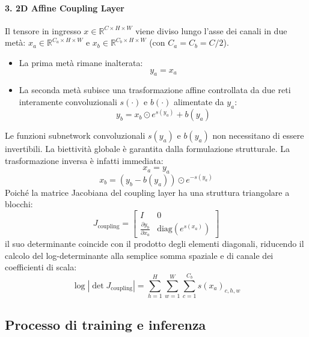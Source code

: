 \paragraph{3. 2D Affine Coupling Layer}
Il tensore in ingresso $x \in \mathbb{R}^{C \times H \times W}$ viene diviso lungo l'asse dei canali in due metà: $x_a \in \mathbb{R}^{C_a \times H \times W}$ e $x_b \in \mathbb{R}^{C_b \times H \times W}$ (con $C_a = C_b = C/2$).
\begin{itemize}
    \item La prima metà rimane inalterata:
    \begin{equation}
        y_a = x_a
    \end{equation}
    \item La seconda metà subisce una trasformazione affine controllata da due reti interamente convoluzionali $s(\cdot)$ e $b(\cdot)$ alimentate da $y_a$:
    \begin{equation}
        y_b = x_b \odot e^{s(y_a)} + b(y_a)
    \end{equation}
\end{itemize}
Le funzioni subnetwork convoluzionali $s(y_a)$ e $b(y_a)$ non necessitano di essere invertibili. La biettività globale è garantita dalla formulazione strutturale. La trasformazione inversa è infatti immediata:
\begin{equation}
    x_a = y_a
\end{equation}
\begin{equation}
    x_b = (y_b - b(y_a)) \odot e^{-s(y_a)}
\end{equation}
Poiché la matrice Jacobiana del coupling layer ha una struttura triangolare a blocchi:
\begin{equation}
    J_{\text{coupling}} = \begin{bmatrix} I & 0 \\ \frac{\partial y_b}{\partial x_a} & \text{diag}\left(e^{s(x_a)}\right) \end{bmatrix}
\end{equation}
il suo determinante coincide con il prodotto degli elementi diagonali, riducendo il calcolo del log-determinante alla semplice somma spaziale e di canale dei coefficienti di scala:
\begin{equation}
    \log \left| \det J_{\text{coupling}} \right| = \sum_{h=1}^H \sum_{w=1}^W \sum_{c=1}^{C_b} s(x_a)_{c, h, w}
\end{equation}

\subsection{Processo di training e inferenza}


